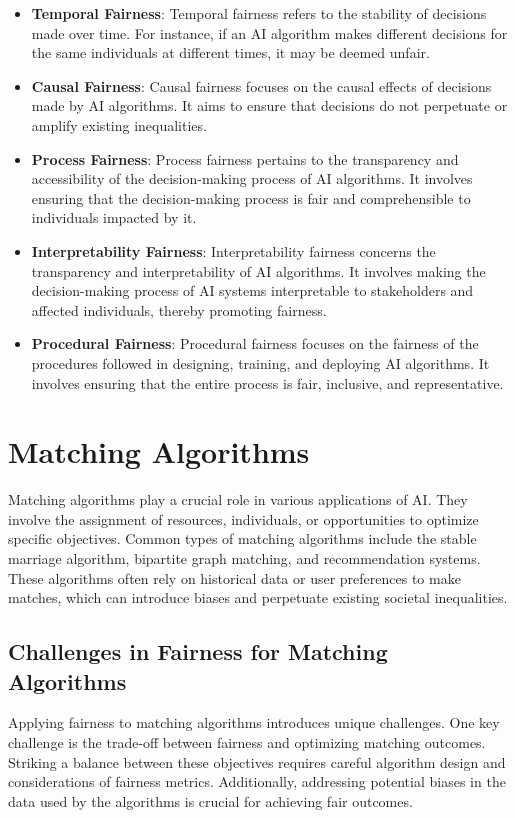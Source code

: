 \documentclass[12pt,a4paper,openright,twoside]{book}
\begin{document}
\begin{itemize}
    \item \textbf{Temporal Fairness}: Temporal fairness refers to the stability of decisions made over time. For instance, if an AI algorithm makes different decisions for the same individuals at different times, it may be deemed unfair.

    \item \textbf{Causal Fairness}: Causal fairness focuses on the causal effects of decisions made by AI algorithms. It aims to ensure that decisions do not perpetuate or amplify existing inequalities.

    \item \textbf{Process Fairness}: Process fairness pertains to the transparency and accessibility of the decision-making process of AI algorithms. It involves ensuring that the decision-making process is fair and comprehensible to individuals impacted by it.

    \item \textbf{Interpretability Fairness}: Interpretability fairness concerns the transparency and interpretability of AI algorithms. It involves making the decision-making process of AI systems interpretable to stakeholders and affected individuals, thereby promoting fairness.

    \item \textbf{Procedural Fairness}: Procedural fairness focuses on the fairness of the procedures followed in designing, training, and deploying AI algorithms. It involves ensuring that the entire process is fair, inclusive, and representative.

\end{itemize}


\section{Matching Algorithms}
Matching algorithms play a crucial role in various applications of AI. They involve the assignment of resources, individuals, or opportunities to optimize specific objectives. Common types of matching algorithms include the stable marriage algorithm, bipartite graph matching, and recommendation systems. These algorithms often rely on historical data or user preferences to make matches, which can introduce biases and perpetuate existing societal inequalities.

\subsection{Challenges in Fairness for Matching Algorithms}
Applying fairness to matching algorithms introduces unique challenges. One key challenge is the trade-off between fairness and optimizing matching outcomes. Striking a balance between these objectives requires careful algorithm design and considerations of fairness metrics. Additionally, addressing potential biases in the data used by the algorithms is crucial for achieving fair outcomes.
\end{document}

